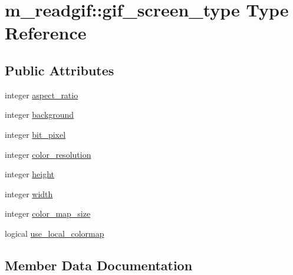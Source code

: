 \hypertarget{structm__readgif_1_1gif__screen__type}{}\section{m\+\_\+readgif\+:\+:gif\+\_\+screen\+\_\+type Type Reference}
\label{structm__readgif_1_1gif__screen__type}
\subsection*{Public Attributes}
\begin{DoxyCompactItemize}
\item 
integer \hyperlink{structm__readgif_1_1gif__screen__type_ab6ae805198c2ec45439be3be1b6f1b98}{aspect\+\_\+ratio}
\item 
integer \hyperlink{structm__readgif_1_1gif__screen__type_a4a31d71ea239de86a385139081f941ba}{background}
\item 
integer \hyperlink{structm__readgif_1_1gif__screen__type_aabb35d3c3029216c0fc92275be788107}{bit\+\_\+pixel}
\item 
integer \hyperlink{structm__readgif_1_1gif__screen__type_ab658d452e13761e1df0ca41584b3473e}{color\+\_\+resolution}
\item 
integer \hyperlink{structm__readgif_1_1gif__screen__type_a98828d2f71961cdc398ec567846e9da4}{height}
\item 
integer \hyperlink{structm__readgif_1_1gif__screen__type_adea440e7648df26d475a1c1531108a29}{width}
\item 
integer \hyperlink{structm__readgif_1_1gif__screen__type_a42c5ab97168acf1f1b9fef9f86fc5393}{color\+\_\+map\+\_\+size}
\item 
logical \hyperlink{structm__readgif_1_1gif__screen__type_af6ecd153af2e29d040055fa6dd92c671}{use\+\_\+local\+\_\+colormap}
\end{DoxyCompactItemize}


\subsection{Member Data Documentation}
\mbox{\label{structm__readgif_1_1gif__screen__type_ab6ae805198c2ec45439be3be1b6f1b98}} 
